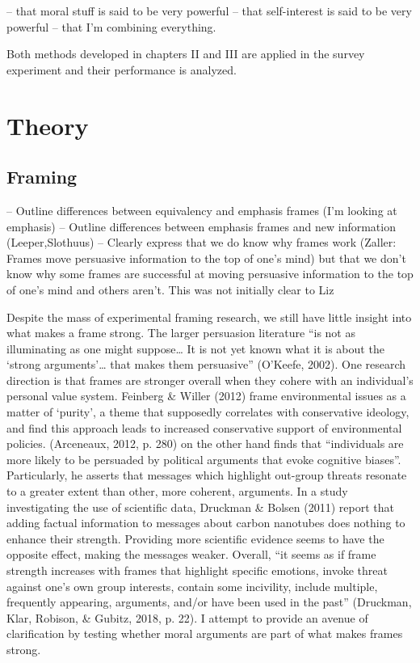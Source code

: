 \documentclass[12pt,econ]{sources/authesis}
\begin{document}
-- that moral stuff is said to be very powerful
-- that self-interest is said to be very powerful
-- that I'm combining everything.

Both methods developed in chapters II and III are applied in the survey experiment and their performance is analyzed.

\hypertarget{framing-theory}{%
\section{Theory}\label{framing-theory}}

\hypertarget{framing-theory-framing}{%
\subsection{Framing}\label{framing-theory-framing}}

-- Outline differences between equivalency and emphasis frames (I'm looking at emphasis)
-- Outline differences between emphasis frames and new information (Leeper,Slothuus)
-- Clearly express that we do know why frames work (Zaller: Frames move persuasive information to the top of one's mind) but that we don't know why some frames are successful at moving persuasive information to the top of one's mind and others aren't. This was not initially clear to Liz

Despite the mass of experimental framing research, we still have little insight into what makes a frame strong. The larger persuasion literature ``is not as illuminating as one might suppose\ldots{} It is not yet known what it is about the `strong arguments'\ldots{} that makes them persuasive'' (O'Keefe, 2002). One research direction is that frames are stronger overall when they cohere with an individual's personal value system. Feinberg \& Willer (2012) frame environmental issues as a matter of `purity', a theme that supposedly correlates with conservative ideology, and find this approach leads to increased conservative support of environmental policies. (Arceneaux, 2012, p. 280) on the other hand finds that ``individuals are more likely to be persuaded by political arguments that evoke cognitive biases''. Particularly, he asserts that messages which highlight out-group threats resonate to a greater extent than other, more coherent, arguments. In a study investigating the use of scientific data, Druckman \& Bolsen (2011) report that adding factual information to messages about carbon nanotubes does nothing to enhance their strength. Providing more scientific evidence seems to have the opposite effect, making the messages weaker. Overall, ``it seems as if frame strength increases with frames that highlight specific emotions, invoke threat against one's own group interests, contain some incivility, include multiple, frequently appearing, arguments, and/or have been used in the past'' (Druckman, Klar, Robison, \& Gubitz, 2018, p. 22). I attempt to provide an avenue of clarification by testing whether moral arguments are part of what makes frames strong.
\end{document}
